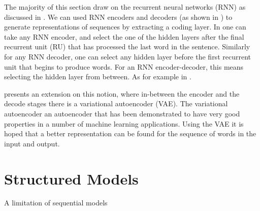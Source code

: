 \documentclass[12pt,parskip]{komatufte}
\begin{document}
The majority of this section draw on the recurrent neural networks (RNN) as discussed in .
We can used RNN encoders and decoders (as shown in ) to generate representations of sequences by extracting a coding layer.
In one can take any RNN encoder,
and select the one of the hidden layers after the final recurrent unit (RU) that has processed the last word in the sentence.
Similarly for any RNN decoder, one can select any hidden layer before the first recurrent unit that begins to produce words.
For an RNN encoder-decoder, this means selecting the hidden layer from between.
As for example in .


 presents an extension on this notion,
where in-between the encoder and the decode stages there is a variational autoencoder (VAE).
The variational autoencoder  an autoencoder that has been demonstrated to have very good properties in a number of machine learning applications.
Using the VAE it is hoped that a better representation can be found for the sequence of words in the input and output.


\begin{figure}
	
	
\end{figure}


\section{Structured Models}
A limitation of sequential models
\end{document}
